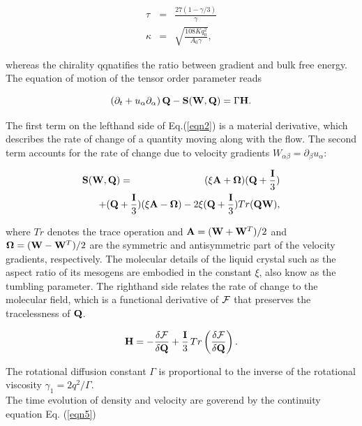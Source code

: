 \documentclass[aps,pre,onecolumn,groupedaddress]{revtex4-1}
\begin{document}
\begin{eqnarray}
\tau&=&\frac{27(1-\gamma/3)}{\gamma}\nonumber\\
\kappa&=&\sqrt{\frac{108 K q_0^2}{A_0 \gamma}}\nonumber,
\end{eqnarray}

whereas the chirality qqnatifies the ratio between gradient and bulk free energy.\\
The equation of motion of the tensor order parameter reads

\begin{equation}\label{}
\left(\partial_t+ u_\alpha \partial_\alpha \right){\bf Q} - {\bf S}({\bf W},{\bf Q}) = \Gamma {\bf H}.
\label{eqn2}
\end{equation}

The first term on the lefthand side of Eq.(\ref{eqn2}) is a material derivative, which describes the rate of change of a quantity moving along with the flow.
The second term accounts for the rate of change due to velocity gradients $W_{\alpha \beta}=\partial_\beta u_\alpha$:

\begin{eqnarray}
{\bf S}({\bf W}, {\bf Q}) &=& (\xi {\bf A} + {\boldsymbol \Omega})({\bf Q}+\frac{\bf I}{3})\nonumber\\
& &\hspace*{-1.5cm}+ ({\bf Q}+\frac{\bf I}{3})(\xi {\bf A}  - {\boldsymbol \Omega})-2 \xi ({\bf Q}+\frac{\bf I}{3})Tr({\bf Q W}),
\label{eqn3}
\end{eqnarray}

where $Tr$ denotes the trace operation and ${\bf A}=({\bf W}+{\bf W}^T)/2$ and ${\boldsymbol \Omega}=({\bf W}-{\bf W}^T)/2$ are the symmetric and antisymmetric part of the velocity gradients, respectively.
The molecular details of the liquid crystal such as the aspect ratio of its mesogens are embodied in the constant $\xi$, also know as the tumbling parameter.
The righthand side relates the rate of change to the molecular field, which is a functional derivative of $\cal F$ that preserves the tracelessness of $\bf Q$.

\begin{equation}
{\bf H}=-\frac{\delta {\cal F}}{\delta {\bf Q}}+\frac{\bf I}{3}\, Tr\left(\frac{\delta {\cal F}}{\delta {\bf Q}}\right).
\label{eqn4}
\end{equation}

The rotational diffusion constant $\Gamma$ is proportional to the inverse of the rotational viscosity $\gamma_1=2 q^2/\Gamma$.\\
The time evolution of density and velocity are goverend by the continuity equation Eq. (\ref{eqn5}) 
\end{document}
